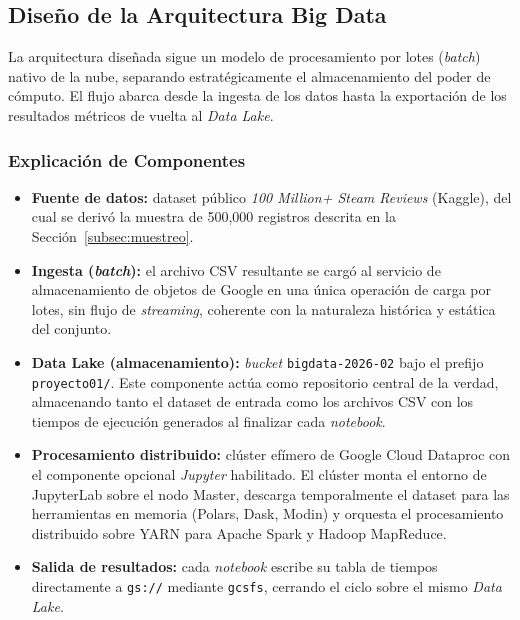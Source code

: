 \subsection{Diseño de la Arquitectura Big Data}

La arquitectura diseñada sigue un modelo de procesamiento por lotes (\textit{batch}) nativo de la nube, separando estratégicamente el almacenamiento del poder de cómputo. El flujo abarca desde la ingesta de los datos hasta la exportación de los resultados métricos de vuelta al \textit{Data Lake}.

\subsubsection{Explicación de Componentes}
\begin{itemize}[leftmargin=*]
    \item \textbf{Fuente de datos:} dataset público \textit{100 Million+ Steam Reviews} (Kaggle), del cual se derivó la muestra de 500,000 registros descrita en la Sección~\ref{subsec:muestreo}.
    \item \textbf{Ingesta (\textit{batch}):} el archivo CSV resultante se cargó al servicio de almacenamiento de objetos de Google en una única operación de carga por lotes, sin flujo de \textit{streaming}, coherente con la naturaleza histórica y estática del conjunto.
    \item \textbf{Data Lake (almacenamiento):} \textit{bucket} \texttt{bigdata-2026-02} bajo el prefijo \texttt{proyecto01/}. Este componente actúa como repositorio central de la verdad, almacenando tanto el dataset de entrada como los archivos CSV con los tiempos de ejecución generados al finalizar cada \textit{notebook}.
    \item \textbf{Procesamiento distribuido:} clúster efímero de Google Cloud Dataproc con el componente opcional \textit{Jupyter} habilitado. El clúster monta el entorno de JupyterLab sobre el nodo Master, descarga temporalmente el dataset para las herramientas en memoria (Polars, Dask, Modin) y orquesta el procesamiento distribuido sobre YARN para Apache Spark y Hadoop MapReduce.
    \item \textbf{Salida de resultados:} cada \textit{notebook} escribe su tabla de tiempos directamente a \texttt{gs://} mediante \texttt{gcsfs}, cerrando el ciclo sobre el mismo \textit{Data Lake}.
\end{itemize}

